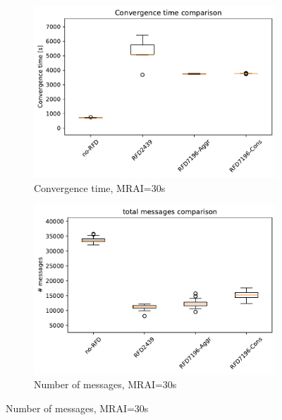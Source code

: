 \begin{figure}[H]
     \vfill
     \begin{subfigure}[b]{0.325\textwidth}
         \centering
         \includegraphics[width=\textwidth]{images/RFD/miceVSelephants/MultiMRAI/30/elephants/cisco_1000MRAI30_rfd_comparison_time_boxplot.pdf}
         \caption{\scriptsize Convergence time, MRAI=30s}
         \label{fig:1000_RFD_MRAI30_time_elephant}
     \end{subfigure}
     \hfill
     \begin{subfigure}[b]{0.325\textwidth}
         \centering
         \includegraphics[width=\textwidth]{images/RFD/miceVSelephants/MultiMRAI/30/elephants/cisco_1000MRAI30_rfd_comparison_messages_boxplot.pdf}
         \caption{\scriptsize Number of messages, MRAI=30s}
         \label{fig:1000_RFD_MRAI30_messages_elephant}
     \end{subfigure}

\end{figure}

